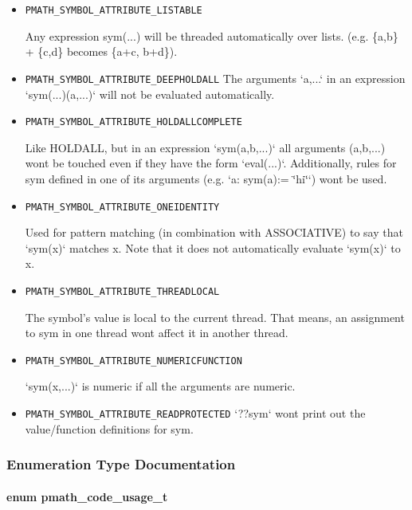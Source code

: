 \begin{itemize}
\item {\tt PMATH\_\-SYMBOL\_\-ATTRIBUTE\_\-LISTABLE} \par
 Any expression sym(...) will be threaded automatically over lists. (e.g. \{a,b\} + \{c,d\} becomes \{a+c, b+d\}).

\item {\tt PMATH\_\-SYMBOL\_\-ATTRIBUTE\_\-DEEPHOLDALL} The arguments `a,...` in an expression `sym(...)(a,...)` will not be evaluated automatically.

\item {\tt PMATH\_\-SYMBOL\_\-ATTRIBUTE\_\-HOLDALLCOMPLETE} \par
 Like HOLDALL, but in an expression `sym(a,b,...)` all arguments (a,b,...) wont be touched even if they have the form `eval(...)`. Additionally, rules for sym defined in one of its arguments (e.g. `a: sym(a):= \char`\"{}hi\char`\"{}`) wont be used.

\item {\tt PMATH\_\-SYMBOL\_\-ATTRIBUTE\_\-ONEIDENTITY} \par
 Used for pattern matching (in combination with ASSOCIATIVE) to say that `sym(x)` matches x. Note that it does not automatically evaluate `sym(x)` to x.

\item {\tt PMATH\_\-SYMBOL\_\-ATTRIBUTE\_\-THREADLOCAL} \par
 The symbol's value is local to the current thread. That means, an assignment to sym in one thread wont affect it in another thread.

\item {\tt PMATH\_\-SYMBOL\_\-ATTRIBUTE\_\-NUMERICFUNCTION} \par
 `sym(x,...)` is numeric if all the arguments are numeric.

\item {\tt PMATH\_\-SYMBOL\_\-ATTRIBUTE\_\-READPROTECTED} `??sym` wont print out the value/function definitions for sym.

\end{itemize}


\subsubsection{Enumeration Type Documentation}
\hypertarget{group__symbols_g957dfb51b09e821a8fc052835ea66670}{
\paragraph[{pmath\_\-code\_\-usage\_\-t}]{\setlength{\rightskip}{0pt plus 5cm}enum {\bf pmath\_\-code\_\-usage\_\-t}}\hfill}
\label{group__symbols_g957dfb51b09e821a8fc052835ea66670}


